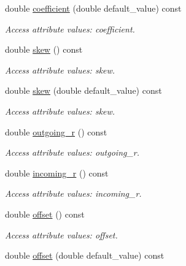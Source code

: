 \begin{DoxyCompactItemize}
double \hyperlink{struct_d_d4hep_1_1_x_m_l_1_1_dimension_aadd3b36cb0b54bb0727f83692d50e1e3}{coefficient} (double default\_\-value) const 
\begin{DoxyCompactList}\small\item\em Access attribute values: coefficient. \item\end{DoxyCompactList}\item 
double \hyperlink{struct_d_d4hep_1_1_x_m_l_1_1_dimension_a15bcb5b0e6be5022ddce3af6e459409b}{skew} () const 
\begin{DoxyCompactList}\small\item\em Access attribute values: skew. \item\end{DoxyCompactList}\item 
double \hyperlink{struct_d_d4hep_1_1_x_m_l_1_1_dimension_a8c265a0ee3443ee2a88612fc6f605fd1}{skew} (double default\_\-value) const 
\begin{DoxyCompactList}\small\item\em Access attribute values: skew. \item\end{DoxyCompactList}\item 
double \hyperlink{struct_d_d4hep_1_1_x_m_l_1_1_dimension_a16f014d9e56dad395fffdda8d1a5f655}{outgoing\_\-r} () const 
\begin{DoxyCompactList}\small\item\em Access attribute values: outgoing\_\-r. \item\end{DoxyCompactList}\item 
double \hyperlink{struct_d_d4hep_1_1_x_m_l_1_1_dimension_a5ea5150aa6940c9fc5873aa3659c6db7}{incoming\_\-r} () const 
\begin{DoxyCompactList}\small\item\em Access attribute values: incoming\_\-r. \item\end{DoxyCompactList}\item 
double \hyperlink{struct_d_d4hep_1_1_x_m_l_1_1_dimension_a75dff2ab1efe07d2960c188854e59cc0}{offset} () const 
\begin{DoxyCompactList}\small\item\em Access attribute values: offset. \item\end{DoxyCompactList}\item 
double \hyperlink{struct_d_d4hep_1_1_x_m_l_1_1_dimension_a7206d0e467ad11a3c2331e3a9f82271c}{offset} (double default\_\-value) const 

\end{DoxyCompactItemize}
